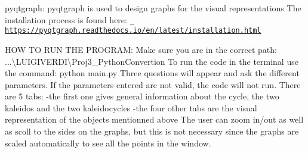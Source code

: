 pyqtgraph\+: pyqtgraph is used to design graphs for the visual representations The installation process is found here\+: \href{https://pyqtgraph.readthedocs.io/en/latest/installation.html}{\texttt{ https\+://pyqtgraph.\+readthedocs.\+io/en/latest/installation.\+html}}

HOW TO RUN THE PROGRAM\+: Make sure you are in the correct path\+: ...\textbackslash{}\+LUIGIVERDI\textbackslash{}\+Proj3\+\_\+\+Python\+Convertion To run the code in the terminal use the command\+: python main.\+py Three questions will appear and ask the different parameters. If the parameters entered are not valid, the code will not run. There are 5 tabs\+: -\/the first one gives general information about the cycle, the two kaleidos and the two kaleidocycles -\/the four other tabs are the visual representation of the objects mentionned above The user can zoom in/out as well as scoll to the sides on the graphs, but this is not necessary since the graphs are scaled automatically to see all the points in the window. 